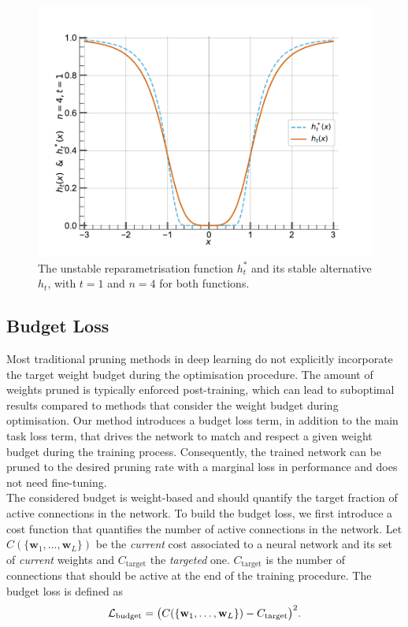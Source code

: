 \begin{figure}
  \centering
  \centerline{\includegraphics[width=0.49\linewidth]{chapter_1/assets/h_stable_vs_unstable.pdf}}
  \caption{ The unstable reparametrisation function $h_t^*$ and its
  stable alternative $h_t$, with $t=1$ and $n=4$ for both functions.} 
  \label{fig:chap1:h_stable_vs_unstable}
\end{figure}

\subsection{Budget Loss}
\label{sec:chap1:budget_loss}
Most traditional pruning methods in deep learning do not explicitly incorporate
the target weight budget during the optimisation procedure. The amount of
weights pruned is typically enforced post-training, which can lead to suboptimal
results compared to methods that consider the weight budget during optimisation.
Our method introduces a budget loss term, in addition to the main task loss
term, that drives the network to match and respect a given weight budget during
the training process. Consequently, the trained network can be pruned to the
desired pruning rate with a marginal loss in performance and does not need
fine-tuning.\\


The considered budget is weight-based and should quantify the target fraction of
active connections in the network. To build the budget loss, we first introduce
a cost function that quantifies the number of active connections in the network.
Let $C(\{\mathbf{w}_1,\dots, \mathbf{w}_L\})$ be the {\em current} cost
associated to a neural network and its set of {\em current} weights and
$C_\text{target}$ the {\em targeted} one. $C_\text{target}$ is the number of
connections that should be active at the end of the training procedure. The
budget loss is defined as \\

\begin{equation}
  \label{eqn:chap1:simple_budget}
  {\cal L}_\text{budget} = \bigl( C(\{\mathbf{w}_1,\dots, \mathbf{w}_L\}) - C_\text{target} \bigr)^2.
\end{equation} \\



